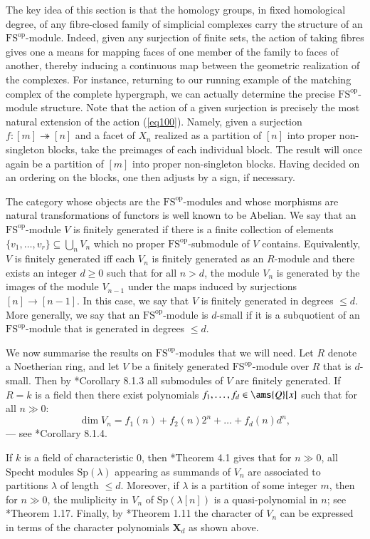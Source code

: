 \documentclass[matann2]{svjour1}
\newcommand{\FSop}{\operatorname{FS^{op}}}
\def\Q{\ams{Q}}
\def\Sp{\mathrm{Sp}}
\begin{document}
The key idea of this section is that the homology groups, in fixed homological 
degree, of any fibre-closed family of simplicial complexes carry the structure of an 
$\FSop$-module. Indeed, given any surjection of finite sets, the action of taking 
fibres gives one a means for mapping faces of one member of the family to faces of 
another, thereby inducing a continuous map between the geometric realization of the 
complexes. For instance, returning to our running example of the matching complex of 
the complete hypergraph, we can actually determine the precise $\FSop$-module 
structure. Note that the action of a given surjection is precisely the most natural 
extension of the action (\ref{eq100}). Namely, given a surjection $f:[m] 
\twoheadrightarrow [n]$ and a facet of $X_n$ realized as a partition of $[n]$ into 
proper non-singleton blocks, take the preimages of each individual block. The result 
will once again be a partition of $[m]$ into proper non-singleton blocks. Having 
decided on an ordering on the blocks, one then adjusts by a sign, if necessary.

The category whose objects are the
$\FSop$-modules and whose morphisms are natural transformations of
functors is well known to be Abelian.
We say that an $\FSop$-module
$V$ is finitely generated if there is a finite
collection of elements $\{v_1,\ldots,v_r\} \subseteq \bigcup_n V_n$
which no proper $\FSop$-submodule of $V$ contains. Equivalently,
$V$ is finitely generated iff each $V_n$ is finitely generated as
an $R$-module
and there exists an integer $d \geq 0$ such that
for all $n > d$, the module $V_n$ is generated by the images of the
module $V_{n-1}$ under the maps induced by surjections $[n] \rightarrow [n-1]$.
In this case, we say that $V$ is finitely generated
in degrees $\leq d$. More generally, we say that an $\FSop$-module
is $d$-small if it is a subquotient of an $\FSop$-module
that is generated in degrees $\leq d$. 

We now summarise the results on $\FSop$-modules that we will need.
Let $R$ denote a Noetherian ring, and let $V$ be a
finitely generated $\FSop$-module over $R$ that is $d$-small.
Then by
\cite{sam}*{Corollary 8.1.3} all submodules of
$V$ are finitely generated. If $R=k$ is a field then 
there exist polynomials $f_1,\ldots,f_d \in \Q[x]$
such that for all $n \gg 0$:
$$
\dim V_n = f_1(n) + f_2(n)2^n + \ldots + f_d(n)d^n,
$$
--- see \cite{sam}*{Corollary 8.1.4}. 
    

If $k$ is a field of
characteristic 0, then \cite{fs-braid}*{Theorem 4.1} gives that
for $n \gg 0$, all Specht modules $\Sp(\lambda)$
appearing as summands of $V_n$ are
associated to partitions $\lambda$ of length $\leq d$.
Moreover, if $\lambda$ is a partition of
some integer $m$, then for $n \gg 0$,
the muliplicity in $V_n$ of $\Sp(\lambda[n])$
is a quasi-polynomial in $n$;
see \cite{Tost2}*{Theorem 1.17}.
Finally, by \cite{Tost2}*{Theorem 1.11}
the character of $V_n$ can be expressed in terms of
the character polynomials $\mathbf{X}_d$ as shown above.
\end{document}
